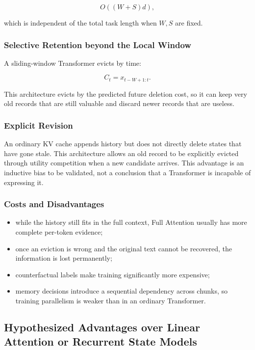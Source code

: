 \[
O((W+S)d),
\]

which is independent of the total task length when $W,S$ are fixed.

\subsubsection{Selective Retention beyond the Local Window}

A sliding-window Transformer evicts by time:

\[
C_t=x_{t-W+1:t}.
\]

This architecture evicts by the predicted future deletion cost, so it can keep very old records that are still valuable and discard newer records that are useless.

\subsubsection{Explicit Revision}

An ordinary KV cache appends history but does not directly delete states that have gone stale. This architecture allows an old record to be explicitly evicted through utility competition when a new candidate arrives. This advantage is an inductive bias to be validated, not a conclusion that a Transformer is incapable of expressing it.

\subsubsection{Costs and Disadvantages}

\begin{itemize}
  \item while the history still fits in the full context, Full Attention usually has more complete per-token evidence;
  \item once an eviction is wrong and the original text cannot be recovered, the information is lost permanently;
  \item counterfactual labels make training significantly more expensive;
  \item memory decisions introduce a sequential dependency across chunks, so training parallelism is weaker than in an ordinary Transformer.
\end{itemize}

\subsection{Hypothesized Advantages over Linear Attention or Recurrent State Models}

